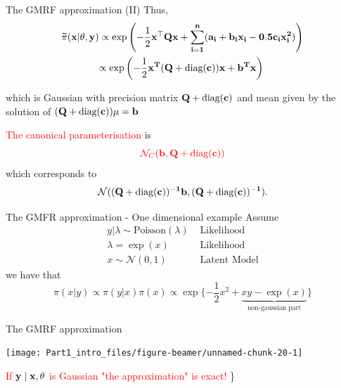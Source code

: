 \documentclass[
  ignorenonframetext,
]{beamer}
\begin{document}
\begin{frame}{The GMRF approximation (II)}
\protect\hypertarget{the-gmrf-approximation-ii}{}
Thus, \[
\begin{aligned}
        \widetilde{\pi}(\bf{x}|\bf{\theta}, \bf{y}) &\propto
            \exp\left(-\frac{1}{2}\bf{x}^\top \bf{Q}\bf{x}  +
            \sum_{i=1}^n (a_i + b_i x_i - 0.5 c_i x_i^2)\right)\\
        &{\propto \exp\left(-\frac{1}{2}\bf{x}^T(\bf{Q} + \text{diag}(\bf{c})) \bf{x} + \bf{b}^T\bf{x}\right)}
\end{aligned}
\]

which is Gaussian with precision matrix \(\bf{Q} + \text{diag}(\bf{c})\)
and mean given by the solution of
\((\bf{Q} + \text{diag}(\bf{c}))\bf{\mu} = \bf{b}\)

\textcolor{red}{The canonical parameterisation} is \[
\textcolor{red}{\mathcal{N}_C(\mathbf{b}, \bf{Q} + \text{diag}(\bf{c}))}
\] which corresponds to \[
\mathcal{N}((\bf{Q} + \text{diag}(\bf{c}))^{-1}\mathbf{b}, (\bf{Q} + \text{diag}(\bf{c}))^{-1}).
\]
\end{frame}

\begin{frame}{The GMFR approximation - One dimensional example}
\protect\hypertarget{the-gmfr-approximation---one-dimensional-example}{}
Assume \[
\begin{aligned}
  y|\lambda \sim\text{Poisson}(\lambda)  & \text{ Likelihood}\\
  \lambda = \exp(x)  & \text{ Likelihood}\\
  x\sim\mathcal{N}(0,1) & \text{ Latent Model}
\end{aligned}
\] we have that \[
  \pi(x|y)\propto\pi(y|x)\pi(x)\propto\exp\{ -\frac{1}{2}x^2+
  \underbrace{xy-\exp(x)}_{\text{non-gaussian part}}
  \}
\]
\end{frame}

\begin{frame}{The GMRF approximation}
\protect\hypertarget{the-gmrf-approximation}{}
\begin{center}\texttt{[image: Part1\_intro\_files/figure-beamer/unnamed-chunk-20-1]} \end{center}

\textcolor{red}{If $\bf{y} \mid \bf{x}, \bf{\theta}$ is Gaussian "the approximation" is exact!}
\}
\end{frame}
\end{document}
